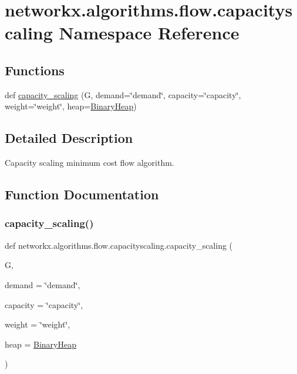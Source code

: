 \hypertarget{namespacenetworkx_1_1algorithms_1_1flow_1_1capacityscaling}{}\section{networkx.\+algorithms.\+flow.\+capacityscaling Namespace Reference}
\label{namespacenetworkx_1_1algorithms_1_1flow_1_1capacityscaling}
\subsection*{Functions}
\begin{DoxyCompactItemize}
\item 
def \hyperlink{namespacenetworkx_1_1algorithms_1_1flow_1_1capacityscaling_a89fd2b12f6d413b022b3f1d4e8a2003d}{capacity\+\_\+scaling} (G, demand=\char`\"{}demand\char`\"{}, capacity=\char`\"{}capacity\char`\"{}, weight=\char`\"{}weight\char`\"{}, heap=\hyperlink{classnetworkx_1_1utils_1_1heaps_1_1BinaryHeap}{Binary\+Heap})
\end{DoxyCompactItemize}


\subsection{Detailed Description}
\begin{DoxyVerb}Capacity scaling minimum cost flow algorithm.
\end{DoxyVerb}
 

\subsection{Function Documentation}
\mbox{\label{namespacenetworkx_1_1algorithms_1_1flow_1_1capacityscaling_a89fd2b12f6d413b022b3f1d4e8a2003d}} 
\subsubsection{\texorpdfstring{capacity\+\_\+scaling()}{capacity\_scaling()}}
{\footnotesize\ttfamily def networkx.\+algorithms.\+flow.\+capacityscaling.\+capacity\+\_\+scaling (\begin{DoxyParamCaption}\item[{}]{G,  }\item[{}]{demand = {\ttfamily \char`\"{}demand\char`\"{}},  }\item[{}]{capacity = {\ttfamily \char`\"{}capacity\char`\"{}},  }\item[{}]{weight = {\ttfamily \char`\"{}weight\char`\"{}},  }\item[{}]{heap = {\ttfamily \hyperlink{classnetworkx_1_1utils_1_1heaps_1_1BinaryHeap}{Binary\+Heap}} }\end{DoxyParamCaption})}

